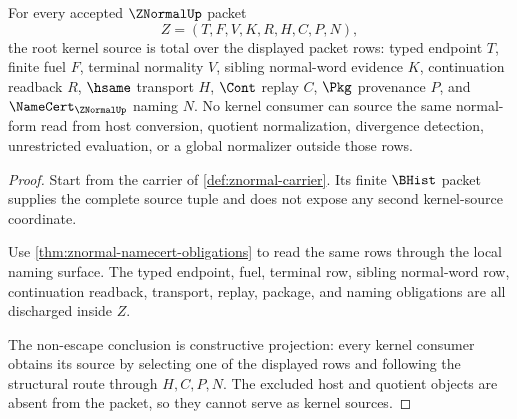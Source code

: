 \begin{theorem}
\label{thm:znormal-root-kernel-source-totality}
For every accepted $\ZNormalUp$ packet
$$
Z=(T,F,V,K,R,H,C,P,N),
$$
the root kernel source is total over the displayed packet rows: typed endpoint $T$, finite fuel $F$, terminal normality $V$, sibling normal-word evidence $K$, continuation readback $R$, $\hsame$ transport $H$, $\Cont$ replay $C$, $\Pkg$ provenance $P$, and $\NameCert_{\ZNormalUp}$ naming $N$. No kernel consumer can source the same normal-form read from host conversion, quotient normalization, divergence detection, unrestricted evaluation, or a global normalizer outside those rows.
\end{theorem}
\begin{proof}
Start from the carrier of \autoref{def:znormal-carrier}. Its finite $\BHist$ packet supplies the complete source tuple and does not expose any second kernel-source coordinate.

Use \autoref{thm:znormal-namecert-obligations} to read the same rows through the local naming surface. The typed endpoint, fuel, terminal row, sibling normal-word row, continuation readback, transport, replay, package, and naming obligations are all discharged inside $Z$.

The non-escape conclusion is constructive projection: every kernel consumer obtains its source by selecting one of the displayed rows and following the structural route through $H,C,P,N$. The excluded host and quotient objects are absent from the packet, so they cannot serve as kernel sources.
\end{proof}

